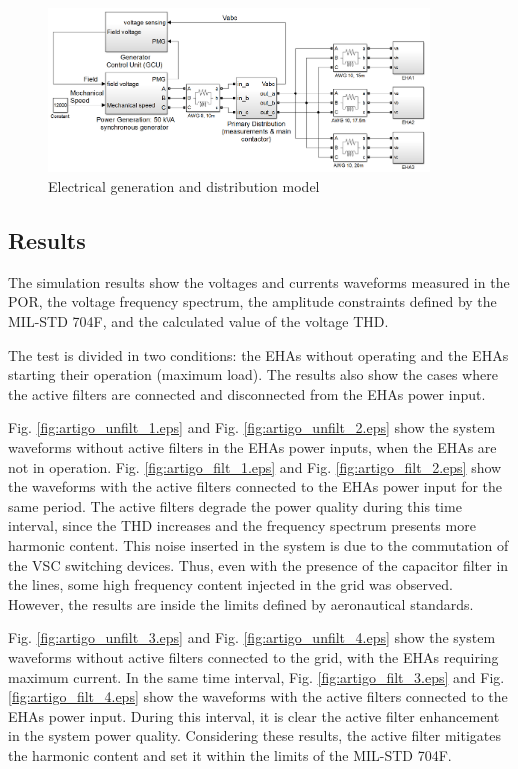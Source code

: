 \begin{figure}[!tb] %
	\centering
	\includegraphics[width=0.9\textwidth]{Figures/simulacao_simulink.png}
	\caption{Electrical generation and distribution model}
	\label{fig:simulacao_simulink.png}
\end{figure}

\subsection{Results}

The simulation results show the voltages and currents waveforms measured in the POR, the voltage frequency spectrum, the amplitude constraints defined by the MIL-STD 704F, and the calculated value of the voltage THD.

The test is divided in two conditions: the EHAs without operating and the EHAs starting their operation (maximum load). The results also show the cases where the active filters are connected and disconnected from the EHAs power input.

Fig. \ref{fig:artigo_unfilt_1.eps} and Fig. \ref{fig:artigo_unfilt_2.eps} show the system waveforms without active filters in the EHAs power inputs, when the EHAs are not in operation. Fig. \ref{fig:artigo_filt_1.eps} and Fig. \ref{fig:artigo_filt_2.eps} show the waveforms with the active filters connected to the EHAs power input for the same period. The active filters degrade the power quality during this time interval, since the THD increases and the frequency spectrum presents more harmonic content. This noise inserted in the system is due to the commutation of the VSC switching devices. Thus, even with the presence of the capacitor filter in the lines, some high frequency content injected in the grid was observed. However, the results are inside the limits defined by aeronautical standards.

Fig. \ref{fig:artigo_unfilt_3.eps} and Fig. \ref{fig:artigo_unfilt_4.eps} show the system waveforms without active filters connected to the grid, with the EHAs requiring maximum current. In the same time interval, Fig. \ref{fig:artigo_filt_3.eps} and Fig. \ref{fig:artigo_filt_4.eps} show the waveforms with the active filters connected to the EHAs power input. During this interval, it is clear the active filter enhancement in the system power quality. Considering these results, the active filter mitigates the harmonic content and set it within the limits of the MIL-STD 704F.


